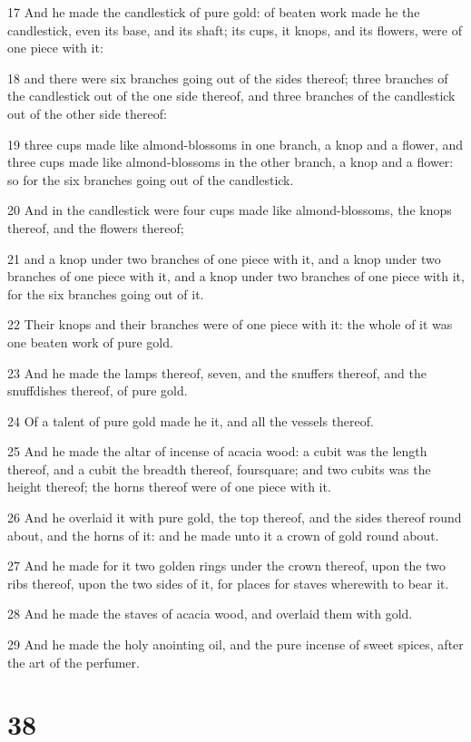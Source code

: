 \par 17 And he made the candlestick of pure gold: of beaten work made he the candlestick, even its base, and its shaft; its cups, it knops, and its flowers, were of one piece with it:
\par 18 and there were six branches going out of the sides thereof; three branches of the candlestick out of the one side thereof, and three branches of the candlestick out of the other side thereof:
\par 19 three cups made like almond-blossoms in one branch, a knop and a flower, and three cups made like almond-blossoms in the other branch, a knop and a flower: so for the six branches going out of the candlestick.
\par 20 And in the candlestick were four cups made like almond-blossoms, the knops thereof, and the flowers thereof;
\par 21 and a knop under two branches of one piece with it, and a knop under two branches of one piece with it, and a knop under two branches of one piece with it, for the six branches going out of it.
\par 22 Their knops and their branches were of one piece with it: the whole of it was one beaten work of pure gold.
\par 23 And he made the lamps thereof, seven, and the snuffers thereof, and the snuffdishes thereof, of pure gold.
\par 24 Of a talent of pure gold made he it, and all the vessels thereof.
\par 25 And he made the altar of incense of acacia wood: a cubit was the length thereof, and a cubit the breadth thereof, foursquare; and two cubits was the height thereof; the horns thereof were of one piece with it.
\par 26 And he overlaid it with pure gold, the top thereof, and the sides thereof round about, and the horns of it: and he made unto it a crown of gold round about.
\par 27 And he made for it two golden rings under the crown thereof, upon the two ribs thereof, upon the two sides of it, for places for staves wherewith to bear it.
\par 28 And he made the staves of acacia wood, and overlaid them with gold.
\par 29 And he made the holy anointing oil, and the pure incense of sweet spices, after the art of the perfumer.

\chapter{38}

